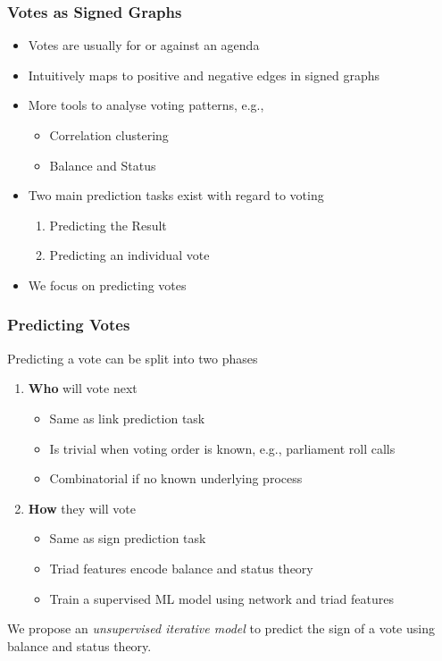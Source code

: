 \documentclass{beamer}
\begin{document}
\begin{frame}
    \frametitle{Votes as Signed Graphs}
    \begin{itemize}
        \item Votes are usually for or against an agenda
        \item Intuitively maps to positive and negative edges in signed graphs 
        \item More tools to analyse voting patterns, e.g.,
        \begin{itemize}
            \item Correlation clustering \cite{brito2020aBrazil,arinik2017signed}
            \item Balance and Status \cite{levorato2016brazilian,derr2018congressional}
        \end{itemize}
        \item Two main prediction tasks exist with regard to voting 
        \begin{enumerate}
            \item Predicting the Result
            \item Predicting an individual vote
        \end{enumerate}
        \item We focus on predicting votes
    \end{itemize}
    
\end{frame}

\begin{frame}
    \frametitle{Predicting Votes}
    Predicting a vote can be split into two phases
    \begin{enumerate}
        \item \textbf{Who} will vote next
        \begin{itemize}
            \item Same as link prediction task
            \item Is trivial when voting order is known, e.g., parliament roll calls
            \item Combinatorial if no known underlying process
        \end{itemize}
        \item \textbf{How} they will vote 
        \begin{itemize}
            \item Same as sign prediction task
            \item Triad features encode balance and status theory
            \item Train a supervised ML model using network and triad features \cite{leskovec2010predicting,leskovec2010signed}
        \end{itemize}
    \end{enumerate}
    We propose an \textit{unsupervised iterative model} to predict the sign of a vote using balance and status theory.

\end{frame}
\end{document}
